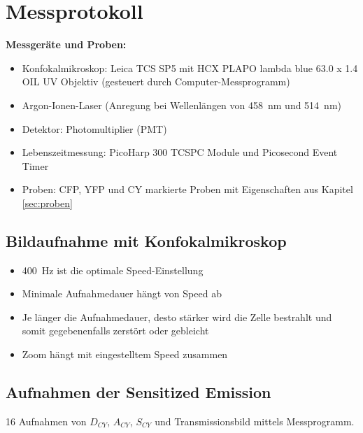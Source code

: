
\def\skalierung{0.65}

\chapter{Messprotokoll}
\label{chap:protokoll}
\textbf{Messgeräte und Proben:}
\begin{itemize}
    \item Konfokalmikroskop: Leica TCS SP5 mit HCX PLAPO lambda blue 63.0 x 1.4 OIL UV Objektiv (gesteuert durch Computer-Messprogramm)
    \item Argon-Ionen-Laser (Anregung bei Wellenlängen von \SI{458}{\nano\metre} und \SI{514}{\nano\metre})
    \item Detektor: Photomultiplier (PMT)
    \item Lebenszeitmessung: PicoHarp 300 TCSPC Module und Picosecond Event Timer
    \item Proben: CFP, YFP und CY markierte Proben mit Eigenschaften aus Kapitel \ref{sec:proben}
\end{itemize}

\section*{Bildaufnahme mit Konfokalmikroskop}
\label{sec:bildaufnahme}
\begin{itemize}
    \item \SI{400}{\hertz} ist die optimale Speed-Einstellung 
    \item Minimale Aufnahmedauer hängt von Speed ab
    \item Je länger die Aufnahmedauer, desto stärker wird die Zelle bestrahlt und somit gegebenenfalls zerstört oder gebleicht
    \item Zoom hängt mit eingestelltem Speed zusammen
\end{itemize}

\section*{Aufnahmen der Sensitized Emission}
\label{sec:aufnahme}
16 Aufnahmen von  $D_{CY}$, $A_{CY}$, $S_{CY}$ und Transmissionsbild mittels Messprogramm.\\


